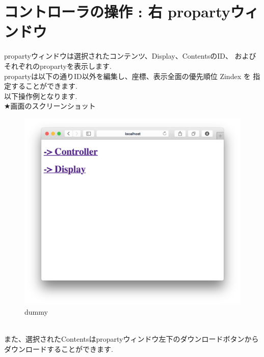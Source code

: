 \documentclass[a4paper,10pt,oneside]{jsbook}
\begin{document}
\chapter{コントローラの操作 : 右 propartyウィンドウ }

propartyウィンドウは選択されたコンテンツ、Display、ContentsのID、
およびそれぞれのpropartyを表示します.\\

propartyは以下の通りID以外を編集し、座標、表示全面の優先順位 Zindex を
指定することができます.\\
以下操作例となります.\\

★画面のスクリーンショット
\begin{figure}[htbp]
	\begin{center}
		\includegraphics[width=11.5cm]{image/home.png}
	\end{center}
	\caption{dummy}
	\label{fig:home}
\end{figure}
\\


また、選択されたContentsはpropartyウィンドウ左下のダウンロードボタンから
ダウンロードすることができます.\\
\end{document}
